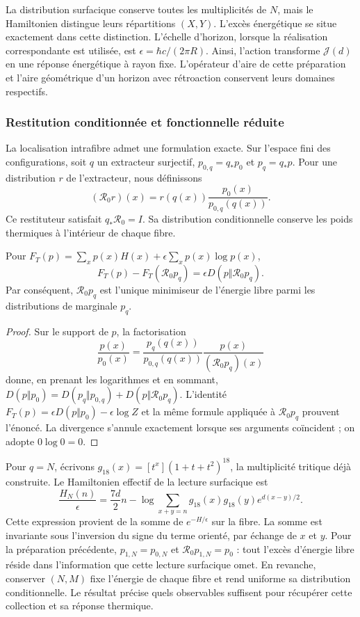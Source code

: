 La distribution surfacique conserve toutes les multiplicités de \(N\),
mais le Hamiltonien distingue leurs répartitions \((X,Y)\). L’excès
énergétique se situe exactement dans cette distinction. L’échelle
d’horizon, lorsque la réalisation correspondante est utilisée, est
\(\epsilon=\hbar c/(2\pi R)\). Ainsi, l’action transforme
\(\mathcal J(d)\) en une réponse énergétique à rayon fixe.
L’opérateur d’aire de cette préparation et l’aire géométrique d’un horizon
avec rétroaction conservent leurs domaines respectifs.

\subsubsection{Restitution conditionnée et fonctionnelle réduite}

La localisation intrafibre admet une formulation exacte. Sur
l’espace fini des configurations, soit \(q\) un extracteur surjectif,
\(p_{0,q}=q_*p_0\) et \(p_q=q_*p\). Pour une distribution \(r\) de
l’extracteur, nous définissons
\[
 (\mathcal R_0r)(x)
 =r(q(x))\frac{p_0(x)}{p_{0,q}(q(x))}.
\]
Ce restituteur satisfait \(q_*\mathcal R_0=I\). Sa distribution
conditionnelle conserve les poids thermiques à l’intérieur de chaque fibre.

\begin{proposition}
\label{ins29:v:restitucion}
Pour \(F_T(p)=\sum_xp(x)H(x)+\epsilon\sum_xp(x)\log p(x)\),
\[
 F_T(p)-F_T(\mathcal R_0p_q)
 =\epsilon D(p\Vert\mathcal R_0p_q).
\]
Par conséquent, \(\mathcal R_0p_q\) est l’unique minimiseur de l’énergie
libre parmi les distributions de marginale \(p_q\).
\end{proposition}
\begin{proof}
Sur le support de \(p\), la factorisation
\[
 \frac{p(x)}{p_0(x)}=
 \frac{p_q(q(x))}{p_{0,q}(q(x))}
 \frac{p(x)}{(\mathcal R_0p_q)(x)}
\]
donne, en prenant les logarithmes et en sommant,
\(D(p\Vert p_0)=D(p_q\Vert p_{0,q})+
D(p\Vert\mathcal R_0p_q)\).
L’identité \(F_T(p)=\epsilon D(p\Vert p_0)-\epsilon\log Z\)
et la même formule appliquée à \(\mathcal R_0p_q\) prouvent
l’énoncé. La divergence s’annule exactement lorsque ses arguments
coïncident ; on adopte \(0\log0=0\).
\end{proof}

Pour \(q=N\), écrivons
\(g_{18}(x)=[t^x](1+t+t^2)^{18}\), la multiplicité tritique déjà
construite. Le Hamiltonien effectif de la lecture surfacique est
\[
 \frac{H_N(n)}\epsilon=
 \frac{7d}{2}n-\log\!\sum_{x+y=n}
 g_{18}(x)g_{18}(y)e^{d(x-y)/2}.
\]
Cette expression provient de la somme de \(e^{-H/\epsilon}\) sur la fibre.
La somme est invariante sous l’inversion du signe du terme orienté,
par échange de \(x\) et \(y\). Pour la préparation précédente,
\(p_{1,N}=p_{0,N}\) et \(\mathcal R_0p_{1,N}=p_0\) : tout l’excès
d’énergie libre réside dans l’information que cette lecture surfacique omet.
En revanche, conserver \((N,M)\) fixe l’énergie de chaque fibre et rend
uniforme sa distribution conditionnelle. Le résultat précise quels
observables suffisent pour récupérer cette collection et sa réponse thermique.
